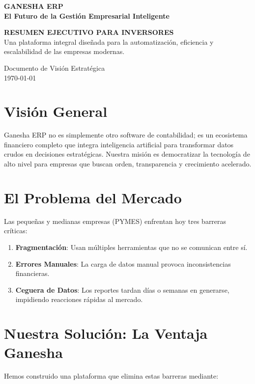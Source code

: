 \documentclass[a4paper,12pt]{article}
\begin{document}
\begin{titlepage}
    \centering
    \vspace*{2cm}
    {\Huge\bfseries\color{primary} GANESHA ERP}\\[0.5cm]
    {\Large\bfseries\color{accent} El Futuro de la Gestión Empresarial Inteligente}\\[2cm]
    
    \begin{tcolorbox}[colback=primary,colframe=primary,arc=5pt,left=30pt,right=30pt,top=30pt,bottom=30pt]
        \centering
        \color{white}
        {\Large\bfseries RESUMEN EJECUTIVO PARA INVERSORES}\\[0.5cm]
        \normalfont Una plataforma integral diseñada para la automatización, eficiencia y escalabilidad de las empresas modernas.
    \end{tcolorbox}
    
    \vfill
    {\large Documento de Visión Estratégica}\\[0.3cm]
    {\large \today}
\end{titlepage}

\section{Visión General}
Ganesha ERP no es simplemente otro software de contabilidad; es un ecosistema financiero completo que integra inteligencia artificial para transformar datos crudos en decisiones estratégicas. Nuestra misión es democratizar la tecnología de alto nivel para empresas que buscan orden, transparencia y crecimiento acelerado.

\section{El Problema del Mercado}
Las pequeñas y medianas empresas (PYMES) enfrentan hoy tres barreras críticas:
\begin{enumerate}
    \item \textbf{Fragmentación}: Usan múltiples herramientas que no se comunican entre sí.
    \item \textbf{Errores Manuales}: La carga de datos manual provoca inconsistencias financieras.
    \item \textbf{Ceguera de Datos}: Los reportes tardan días o semanas en generarse, impidiendo reacciones rápidas al mercado.
\end{enumerate}

\section{Nuestra Solución: La Ventaja Ganesha}
Hemos construido una plataforma que elimina estas barreras mediante:
\end{document}
